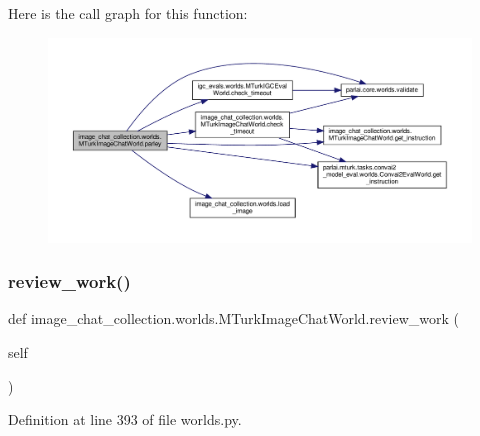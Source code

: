 Here is the call graph for this function\+:
\nopagebreak
\begin{figure}[H]
\begin{center}
\leavevmode
\includegraphics[width=350pt]{classimage__chat__collection_1_1worlds_1_1MTurkImageChatWorld_a7af5e011cc93106144797115af770537_cgraph}
\end{center}
\end{figure}
\mbox{\label{classimage__chat__collection_1_1worlds_1_1MTurkImageChatWorld_a02bb22cb19e1f1ccecab9043a18741e1}} 
\subsubsection{\texorpdfstring{review\+\_\+work()}{review\_work()}}
{\footnotesize\ttfamily def image\+\_\+chat\+\_\+collection.\+worlds.\+M\+Turk\+Image\+Chat\+World.\+review\+\_\+work (\begin{DoxyParamCaption}\item[{}]{self }\end{DoxyParamCaption})}



Definition at line 393 of file worlds.\+py.




